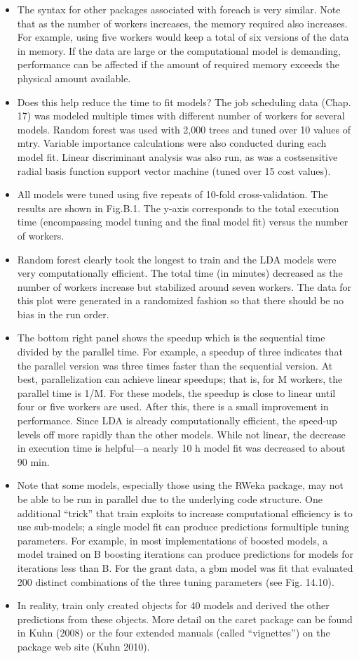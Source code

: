 \documentclass[caret-main.tex]{subfiles}
\begin{document}
\begin{itemize}
\item The syntax for other packages associated with foreach is very similar. Note
that as the number of workers increases, the memory required also increases.
For example, using five workers would keep a total of six versions of the data
in memory. If the data are large or the computational model is demanding,
performance can be affected if the amount of required memory exceeds the
physical amount available.
\item Does this help reduce the time to fit models? The job scheduling data
(Chap. 17) was modeled multiple times with different number of workers for
several models. Random forest was used with 2,000 trees and tuned over 10
values of mtry. Variable importance calculations were also conducted during
each model fit. Linear discriminant analysis was also run, as was a costsensitive
radial basis function support vector machine (tuned over 15 cost
values). 
\item All models were tuned using five repeats of 10-fold cross-validation.
The results are shown in Fig.B.1. The y-axis corresponds to the total execution
time (encompassing model tuning and the final model fit) versus the
number of workers. 
\item Random forest clearly took the longest to train and the
LDA models were very computationally efficient. The total time (in minutes)
decreased as the number of workers increase but stabilized around seven
workers. The data for this plot were generated in a randomized fashion so
that there should be no bias in the run order. 
\item The bottom right panel shows
the speedup which is the sequential time divided by the parallel time. For example,
a speedup of three indicates that the parallel version was three times
faster than the sequential version. At best, parallelization can achieve linear
speedups; that is, for M workers, the parallel time is 1/M. For these models,
the speedup is close to linear until four or five workers are used. After this,
there is a small improvement in performance. Since LDA is already computationally
efficient, the speed-up levels off more rapidly than the other models.
While not linear, the decrease in execution time is helpful—a nearly 10 h
model fit was decreased to about 90 min.
\item Note that some models, especially those using the RWeka package, may
not be able to be run in parallel due to the underlying code structure.
One additional “trick” that train exploits to increase computational efficiency
is to use sub-models; a single model fit can produce predictions formultiple tuning parameters. For example, in most implementations of boosted
models, a model trained on B boosting iterations can produce predictions for
models for iterations less than B. For the grant data, a gbm model was fit
that evaluated 200 distinct combinations of the three tuning parameters (see
Fig. 14.10). 
\item In reality, train only created objects for 40 models and derived
the other predictions from these objects.
More detail on the caret package can be found in Kuhn (2008) or the four
extended manuals (called “vignettes”) on the package web site (Kuhn 2010).
\end{itemize}
\end{document}

